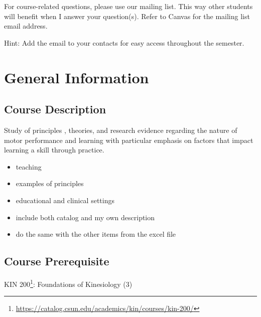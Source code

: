 \documentclass[
  letterpaper,
  DIV=11,
  numbers=noendperiod,
  oneside]{scrartcl}
\DeclareRobustCommand{\href}[2]{#2\footnote{\url{#1}}}
\begin{document}
\begin{tcolorbox}[enhanced jigsaw, breakable, colbacktitle=quarto-callout-note-color!10!white, colframe=quarto-callout-note-color-frame, opacitybacktitle=0.6, title=\textcolor{quarto-callout-note-color}{\faInfo}\hspace{0.5em}{Note}, opacityback=0, colback=white, bottomrule=.15mm, toprule=.15mm, left=2mm, rightrule=.15mm, toptitle=1mm, titlerule=0mm, arc=.35mm, bottomtitle=1mm, leftrule=.75mm, coltitle=black]
For course-related questions, please use our mailing list. This way
other students will benefit when I answer your question(s). Refer to
Canvas for the mailing list email address.

Hint: Add the email to your contacts for easy access throughout the
semester.
\end{tcolorbox}

\hypertarget{general-information}{%
\section{General Information}\label{general-information}}

\hypertarget{course-description}{%
\subsection{Course Description}\label{course-description}}

Study of principles , theories, and research evidence regarding the
nature of motor performance and learning with particular emphasis on
factors that impact learning a skill through practice.

\begin{itemize}
\item
  teaching
\item
  examples of principles
\item
  educational and clinical settings
\item
  include both catalog and my own description
\item
  do the same with the other items from the excel file
\end{itemize}

\hypertarget{course-prerequisite}{%
\subsection{Course Prerequisite}\label{course-prerequisite}}

\href{https://catalog.csun.edu/academics/kin/courses/kin-200/}{KIN 200}:
Foundations of Kinesiology (3)
\end{document}
